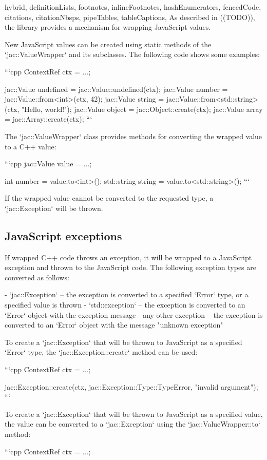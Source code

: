 \begin{markdown*}{%
  hybrid,
  definitionLists,
  footnotes,
  inlineFootnotes,
  hashEnumerators,
  fencedCode,
  citations,
  citationNbsps,
  pipeTables,
  tableCaptions,
}
As described in ((TODO)), the library provides a mechanism for wrapping JavaScript values.

New JavaScript values can be created using static methods of the `jac::ValueWrapper` and its subclasses. The following code shows some examples:

```cpp
ContextRef ctx = ...;

jac::Value undefined = jac::Value::undefined(ctx);
jac::Value number = jac::Value::from<int>(ctx, 42);
jac::Value string = jac::Value::from<std::string>(ctx, "Hello, world!");
jac::Value object = jac::Object::create(ctx);
jac::Value array = jac::Array::create(ctx);
```

The `jac::ValueWrapper` class provides methods for converting the wrapped value to a C++ value:

```cpp
jac::Value value = ...;

int number = value.to<int>();
std::string string = value.to<std::string>();
```

If the wrapped value cannot be converted to the requested type, a `jac::Exception` will be thrown.

\subsection{JavaScript exceptions}

If wrapped C++ code throws an exception, it will be wrapped to a JavaScript exception and thrown to the JavaScript code. The following exception types are converted as follows:

  - `jac::Exception` -- the exception is converted to a specified `Error` type, or a specified value is thrown
  - `std::exception` -- the exception is converted to an `Error` object with the exception message
  - any other exception -- the exception is converted to an `Error` object with the message "unknown exception"

To create a `jac::Exception` that will be thrown to JavaScript as a specified `Error` type, the `jac::Exception::create` method can be used:

```cpp
ContextRef ctx = ...;

jac::Exception::create(ctx, jac::Exception::Type::TypeError, "invalid argument");
```

To create a `jac::Exception` that will be thrown to JavaScript as a specified value, the value can be converted to a `jac::Exception` using the `jac::ValueWrapper::to` method:

```cpp
ContextRef ctx = ...;


\end{markdown*}
